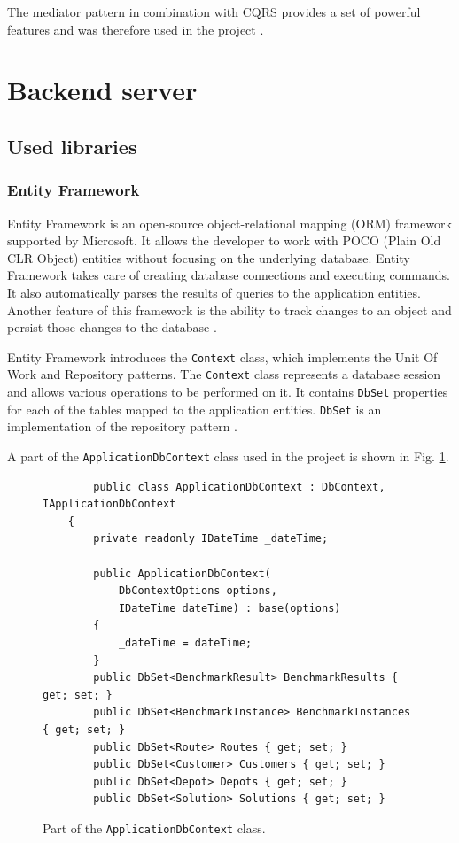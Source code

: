 \documentclass[a4paper,twoside,12pt]{book}
\begin{document}
The mediator pattern in combination with CQRS provides a set of powerful features and was therefore used in the project \cite{bib:mediatorCQRS}.

\section{Backend server}

\subsection{Used libraries}

\subsubsection{Entity Framework}
Entity Framework is an open-source object-relational mapping (ORM) framework supported by Microsoft. It allows the developer to work with POCO (Plain Old CLR Object) entities without focusing on the underlying database. Entity Framework takes care of creating database connections and executing commands. It also automatically parses the results of queries to the application entities. Another feature of this framework is the ability to track changes to an object and persist those changes to the database \cite{bib:ef}. 

Entity Framework introduces the \lstinline|Context| class, which implements the Unit Of Work and Repository patterns. The \lstinline|Context| class represents a database session and allows various operations to be performed on it. It contains \lstinline|DbSet| properties for each of the tables mapped to the application entities. \lstinline|DbSet| is an implementation of the repository pattern \cite{bib:efRepository}.  

A part of the \lstinline|ApplicationDbContext| class used in the project is shown in Fig. \ref{fig:context}.
     
\begin{figure}[htb]
\centering
\begin{lstlisting}
        public class ApplicationDbContext : DbContext, IApplicationDbContext
    {
        private readonly IDateTime _dateTime;

        public ApplicationDbContext(
            DbContextOptions options,
            IDateTime dateTime) : base(options)
        {
            _dateTime = dateTime;
        }
        public DbSet<BenchmarkResult> BenchmarkResults { get; set; }
        public DbSet<BenchmarkInstance> BenchmarkInstances { get; set; }
        public DbSet<Route> Routes { get; set; }
        public DbSet<Customer> Customers { get; set; }
        public DbSet<Depot> Depots { get; set; }
        public DbSet<Solution> Solutions { get; set; }
\end{lstlisting}
\caption{Part of the \lstinline|ApplicationDbContext| class.}
\label{fig:context}
\end{figure}
\end{document}
